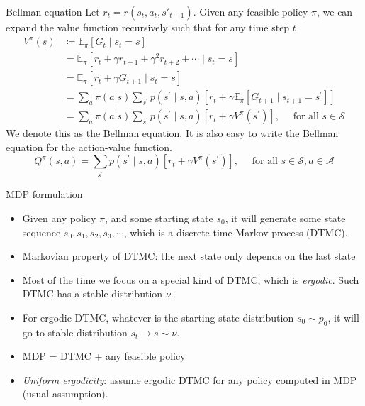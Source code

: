 \documentclass[handout]{beamer}
\begin{document}
\begin{frame}{Bellman equation}
    \small
    Let $r_t = r(s_t, a_t, s'_{t+1})$. Given any feasible policy $\pi$, we can expand the value function recursively such that for any time step $t$
    \begin{equation}
    \begin{aligned}
    V^{\pi}(s) & \coloneqq \mathbb{E}_{\pi}\left[G_{t} \mid s_{t}=s\right] \\
    &=\mathbb{E}_{\pi}\left[r_{t}+\gamma r_{t+1} + \gamma^2 r_{t+2} + \cdots \mid s_{t}=s\right] \\
    &=\mathbb{E}_{\pi}\left[r_{t}+\gamma G_{t+1} \mid s_{t}=s\right] \\
    &=\sum_{a} \pi(a | s) \sum_{s^{\prime}} p\left(s^{\prime} \mid s, a\right)\left[r_t +\gamma \mathbb{E}_{\pi}\left[G_{t+1} \mid s_{t+1}=s^{\prime}\right]\right] \\
    &=\sum_{a} \pi(a | s) \sum_{s^{\prime}} p\left(s^{\prime}\mid s, a\right)\left[r_t +\gamma V^{\pi}\left(s^{\prime}\right)\right], \quad \text { for all } s \in \mathcal{S}
\end{aligned}
\end{equation}
We denote this as the Bellman equation. It is also easy to write the Bellman equation for the action-value function.
$$
Q^{\pi}(s,a) = \sum_{s^{\prime}} p\left(s^{\prime}\mid s, a\right)\left[r_t +\gamma V^{\pi}\left(s^{\prime}\right)\right], \quad \text { for all } s \in \mathcal{S}, a\in \mathcal{A}
$$
\end{frame}

\begin{frame}{MDP formulation}
    \small
    \begin{itemize}
        \item Given any policy $\pi$, and some starting state $s_0$, it will generate some state sequence $s_0, s_1, s_2, s_3,\cdots$, which is a discrete-time Markov process (DTMC).
        \item Markovian property of DTMC: the next state only depends on the last state 
        \item Most of the time we focus on a special kind of DTMC, which is \textit{ergodic}. Such DTMC has a stable distribution $\nu$. 
        \item For ergodic DTMC, whatever is the starting state distribution $s_0 \sim p_0$, it will go to stable distribution $s_t\rightarrow s \sim \nu$.
        \item MDP = DTMC + any feasible policy
        \item \textit{Uniform ergodicity}: assume ergodic DTMC for any policy computed in MDP (usual assumption).
    \end{itemize}
\end{frame}
\end{document}
